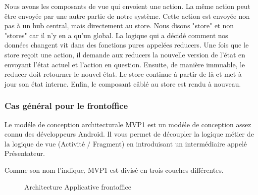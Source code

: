 Nous avons les composants de vue qui envoient une action. La m\^eme action peut \^etre envoy\'ee par une autre partie de notre syst\`eme. Cette action est envoy\'ee non pas \`a un hub central, mais directement au store. Nous disons "store" et non "stores" car il n'y en a qu'un global. La logique qui a d\'ecid\'e comment nos donn\'ees changent vit dans des fonctions pures appel\'ees reducers. Une fois que le store re\c{c}oit une action, il demande aux reducers la nouvelle version de l'\'etat en envoyant l'\'etat actuel et l'action en question. Ensuite, de mani\`ere immuable, le reducer doit retourner le nouvel \'etat. Le store continue \`a partir de l\`a et met \`a jour son \'etat interne. Enfin, le composant c\^abl\'e au store est rendu \`a nouveau.


\subsubsection{Cas g\'en\'eral pour le frontoffice}

Le mod\'ele de conception architecturale \gls{MVP1} est un mod\'ele de conception assez connu des d\'eveloppeurs Android. Il vous permet de d\'ecoupler la logique m\'etier de la logique de vue (Activit\'e / Fragment) en introduisant un interm\'ediaire appel\'e Pr\'esentateur.

Comme son nom l'indique, \gls{MVP1} est divis\'e en trois couches diff\'erentes.

\begin{figure}[H]
	\caption{\label{fig:my-label} Architecture Applicative frontoffice}
\end{figure}

